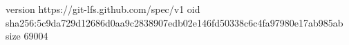 version https://git-lfs.github.com/spec/v1
oid sha256:5c9da729d12686d0aa9c2838907edb02e146fd50338c6c4fa97980e17ab985ab
size 69004
